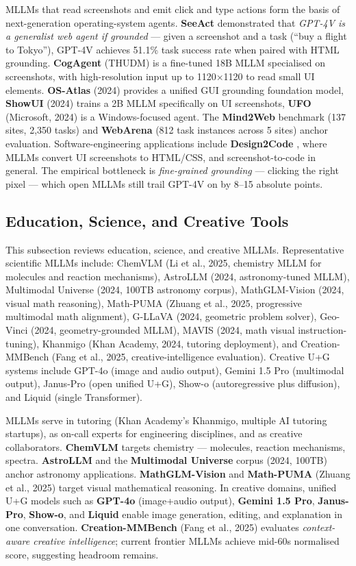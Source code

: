 \documentclass{article}
\begin{document}
MLLMs that read screenshots and emit click and type actions form the basis of next-generation operating-system agents. \textbf{SeeAct} \citep{zheng20242024} demonstrated that \emph{GPT-4V is a generalist web agent if grounded} --- given a screenshot and a task (``buy a flight to Tokyo''), GPT-4V achieves 51.1\% task success rate when paired with HTML grounding. \textbf{CogAgent} (THUDM) is a fine-tuned 18B MLLM specialised on screenshots, with high-resolution input up to 1120×1120 to read small UI elements. \textbf{OS-Atlas} (2024) provides a unified GUI grounding foundation model, \textbf{ShowUI} (2024) trains a 2B MLLM specifically on UI screenshots, \textbf{UFO} (Microsoft, 2024) is a Windows-focused agent. The \textbf{Mind2Web} benchmark (137 sites, 2,350 tasks) and \textbf{WebArena} (812 task instances across 5 sites) anchor evaluation. Software-engineering applications include \textbf{Design2Code} \citep{si20242024}, where MLLMs convert UI screenshots to HTML/CSS, and screenshot-to-code in general. The empirical bottleneck is \emph{fine-grained grounding} --- clicking the right pixel --- which open MLLMs still trail GPT-4V on by 8--15 absolute points.

\subsection{Education, Science, and Creative Tools}\label{education-science-and-creative-tools}

This subsection reviews education, science, and creative MLLMs. Representative scientific MLLMs include: ChemVLM (Li et al., 2025, chemistry MLLM for molecules and reaction mechanisms), AstroLLM (2024, astronomy-tuned MLLM), Multimodal Universe (2024, 100TB astronomy corpus), MathGLM-Vision (2024, visual math reasoning), Math-PUMA (Zhuang et al., 2025, progressive multimodal math alignment), G-LLaVA (2024, geometric problem solver), Geo-Vinci (2024, geometry-grounded MLLM), MAVIS (2024, math visual instruction-tuning), Khanmigo (Khan Academy, 2024, tutoring deployment), and Creation-MMBench (Fang et al., 2025, creative-intelligence evaluation). Creative U+G systems include GPT-4o (image and audio output), Gemini 1.5 Pro (multimodal output), Janus-Pro (open unified U+G), Show-o (autoregressive plus diffusion), and Liquid (single Transformer).

MLLMs serve in tutoring (Khan Academy's Khanmigo, multiple AI tutoring startups), as on-call experts for engineering disciplines, and as creative collaborators. \textbf{ChemVLM} \citep{li20252025} targets chemistry --- molecules, reaction mechanisms, spectra. \textbf{AstroLLM} and the \textbf{Multimodal Universe} corpus (2024, 100TB) anchor astronomy applications. \textbf{MathGLM-Vision} and \textbf{Math-PUMA} (Zhuang et al., 2025) target visual mathematical reasoning. In creative domains, unified U+G models such as \textbf{GPT-4o} (image+audio output), \textbf{Gemini 1.5 Pro}, \textbf{Janus-Pro}, \textbf{Show-o}, and \textbf{Liquid} enable image generation, editing, and explanation in one conversation. \textbf{Creation-MMBench} (Fang et al., 2025) evaluates \emph{context-aware creative intelligence}; current frontier MLLMs achieve mid-60s normalised score, suggesting headroom remains.
\end{document}
